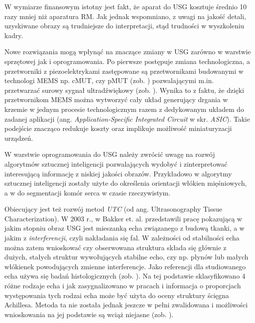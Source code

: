 W wymiarze finansowym istotny jest fakt, że aparat do USG kosztuje średnio 10 razy mniej niż aparatura RM. Jak jednak wspomniano, z uwagi na jakość detali, uzyskiwane obrazy są trudniejsze do interpretacji, stąd trudności w  wyszkoleniu kadry. 

Nowe rozwiązania mogą wpłynąć na znaczące zmiany w USG zarówno w warstwie sprzętowej jak i oprogramowania. Po pierwsze postępuje zmiana technologiczna, a przetworniki z piezoelektrykami zastępowane są przetwornikami budowanymi \linebreak w technologi MEMS np. cMUT, czy pMUT (zob. \cite{Butterfly2018})  pozwalającymi m.in. przetwarzać surowy sygnał ultradźwiękowy (zob. \cite{US4US}). Wynika to z faktu, że dzięki przetwornikom MEMS można wytworzyć cały układ generujący drgania w krzemie w jednym procesie technologicznym razem z dedykowanym układem do zadanej aplikacji (ang. \textit{Application-Specific Integrated Circuit} w skr. \textit{ASIC}). Takie podejście znacząco redukuje koszty oraz implikuje możliwość miniaturyzacji urządzeń.

W warstwie oprogramowania do USG należy zwrócić uwagę na rozwój algorytmów sztucznej inteligencji pozwalających wydobyć i zinterpretować interesującą informację z niskiej jakości obrazów. Przykładowo w \cite{Cunningham2017} algorytmy sztucznej inteligencji zostały użyte do określenia orientacji włókien mięśniowych, a w \cite{NVIDIA-CLARA} \linebreak do segmentacji komór serca w czasie rzeczywistym. 

Obiecujący jest też rozwój metod \textit{UTC} (od ang. Ultrasonography Tissue Characterization). W 2003 r., w \cite{Bakker2003} Bakker et. al. przedstawili pracę pokazującą w jakim stopniu obraz USG jest mieszanką echa związanego z budową tkanki, a w jakim \linebreak z \textit{interferencji}, czyli nakładania się fal. W zależności od stabilności echa można zatem wnioskować czy obserwowana struktura składa się głównie z dużych, stałych struktur wywołujących stabilne echo, czy np. płynów lub małych włókienek powodujących zmienne interferencje. Jako referencji dla studiowanego echa używa się badań histologicznych (zob. \cite{Bakker2000}). Na tej podstawie sklasyfikowano 4 różne rodzaje echa i jak zasygnalizowano w pracach \cite{vanSchie2009} i \cite{Heyward2018} informacja o proporcjach występowania tych rodzai echa może być użyta do oceny struktury ścięgna Achillesa. Metoda ta nie została jednak jeszcze w pełni zwalidowana i możliwości wnioskowania na jej podstawie \linebreak są wciąż niejasne (zob. \cite{Heyward2018}).

